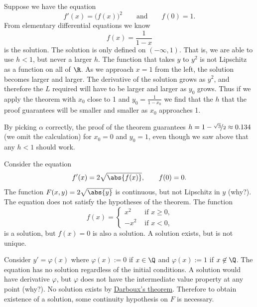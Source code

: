 \documentclass[12pt]{book}
\begin{document}
\begin{example}
Suppose we have the equation
\begin{equation*}
f'(x) = {\bigl(f(x)\bigr)}^2 \qquad \text{and} \qquad f(0)=1.
\end{equation*}
From elementary differential equations we know 
\begin{equation*}
f(x) = \frac{1}{1-x}
\end{equation*}
is the solution.
The solution is only defined on $(-\infty,1)$.
That is,
we are able to use $h < 1$, but never a larger $h$.
The function that takes $y$ to $y^2$ is
not Lipschitz as a function on all of $\R$.
As we approach $x=1$ from the left, the solution becomes larger
and larger.
The derivative of the solution grows as $y^2$, and therefore
the $L$ required will have to be larger and larger as $y_0$ grows.
Thus if we apply the
theorem with $x_0$ close to 1 and $y_0 = \frac{1}{1-x_0}$ we find
that the $h$ that the proof guarantees will be smaller and smaller as $x_0$
approaches 1.

By picking $\alpha$ correctly, the proof of the theorem guarantees
$h=1-\nicefrac{\sqrt{3}}{2} \approx 0.134$ (we omit the
calculation) for $x_0=0$ and $y_0=1$, even though
we saw above that any $h < 1$ should work.
\end{example}

\begin{example}
Consider the equation
\begin{equation*}
f'(x) = 2 \sqrt{\abs{f(x)}}, \qquad f(0) = 0 .
\end{equation*}
The function $F(x,y) = 2 \sqrt{\abs{y}}$ is continuous,
but not Lipschitz in $y$ (why?). 
The equation does not satisfy the hypotheses of the theorem.
The function
\begin{equation*}
f(x) =
\begin{cases}
x^2 & \text{ if $x \geq 0$,}\\
-x^2 & \text{ if $x < 0$,}
\end{cases}
\end{equation*}
is a solution, but $f(x) = 0$ is also a solution.
A solution exists, but is not unique.
\end{example}

\begin{example}
Consider $y' = \varphi(x)$ where $\varphi(x) := 0$ if $x \in \Q$ and
$\varphi(x):=1$ if $x
\not\in \Q$.
The equation has no solution regardless of the initial
conditions.
A solution would have
derivative $\varphi$, but $\varphi$ does not have the intermediate value property
at any point (why?).
No solution exists by
\hyperref[thm:darboux]{Darboux's theorem}.
Therefore to obtain existence of a solution, some continuity hypothesis on
$F$ is necessary.
\end{example}
\end{document}
